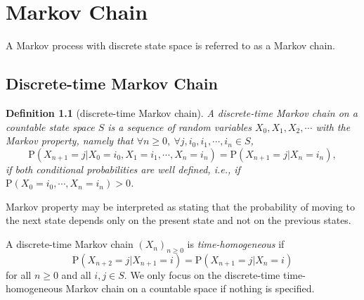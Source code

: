 \documentclass{report}
\newtheorem{definition}{Definition}[section]
\theoremstyle{nonumberplain}
\begin{document}
\chapter{Markov Chain}
A Markov process with discrete state space is referred to as a Markov chain.
\section{Discrete-time Markov Chain}
\begin{definition}[discrete-time Markov chain]
	A \emph{discrete-time Markov chain} on a countable state space $S$ is a sequence of random variables $X_0, X_1, X_2,\cdots$ with the Markov property, namely that $\forall n\ge0,\ \forall j,i_0,i_1,\cdots,i_n\in S$,	
	\[
	\mathrm{P}(X_{n+1}=j| X_{0}=i_{0},X_{1}=i_{1},\cdots,X_{n}=i_{n})=\mathrm{P}(X_{n+1}=j| X_{n}=i_{n}), 
	\] if both conditional probabilities are well defined, i.e., if $ 	\mathrm{P}(X_{0}=i_{0},\cdots ,X_{n}=i_{n})>0$.
\end{definition}	
Markov property may be interpreted as stating that the probability of moving to the next state depends only on the present state and not on the previous states. 

\noindent A discrete-time Markov chain $(X_n)_{n\ge0}$ is \emph{time-homogeneous} if
\[
\mathrm{P}(X_{n+2}=j| X_{n+1}=i)=\mathrm{P}(X_{n+1}=j| X_{n}=i)
\]
for all $n\ge0$ and all $i,j\in S$. We only focus on the discrete-time time-homogeneous Markov chain on a countable space if nothing is specified. 
\end{document}
